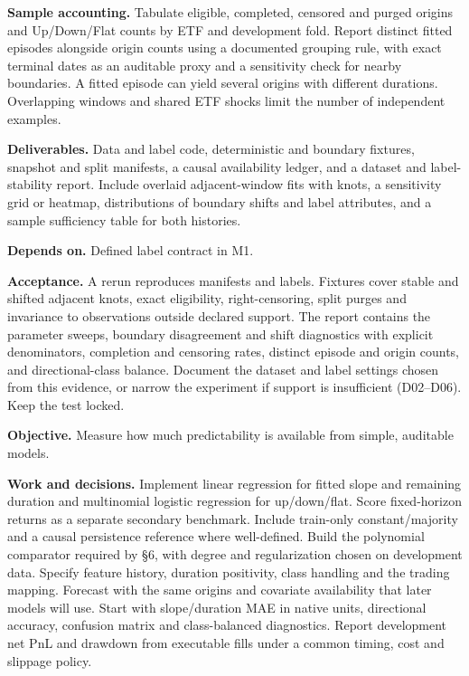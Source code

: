 \documentclass[10pt,letterpaper]{article}
\newcommand{\pagetitle}[2]{\vspace*{9pt}{\small\bfseries #1\par}\vspace{5pt}{\LARGE\bfseries #2\par}\vspace{9pt}}
\newcommand{\topic}[1]{\par\smallskip{\large\bfseries #1\par}}
\begin{document}
\textbf{Sample accounting.} Tabulate eligible, completed, censored and purged origins and Up/Down/Flat counts by ETF and development fold. Report distinct fitted episodes alongside origin counts using a documented grouping rule, with exact terminal dates as an auditable proxy and a sensitivity check for nearby boundaries. A fitted episode can yield several origins with different durations. Overlapping windows and shared ETF shocks limit the number of independent examples.\par

\textbf{Deliverables.} Data and label code, deterministic and boundary fixtures, snapshot and split manifests, a causal availability ledger, and a dataset and label-stability report. Include overlaid adjacent-window fits with knots, a sensitivity grid or heatmap, distributions of boundary shifts and label attributes, and a sample sufficiency table for both histories.\par

\textbf{Depends on.} Defined label contract in M1.\par

\textbf{Acceptance.} A rerun reproduces manifests and labels. Fixtures cover stable and shifted adjacent knots, exact eligibility, right-censoring, split purges and invariance to observations outside declared support. The report contains the parameter sweeps, boundary disagreement and shift diagnostics with explicit denominators, completion and censoring rates, distinct episode and origin counts, and directional-class balance. Document the dataset and label settings chosen from this evidence, or narrow the experiment if support is insufficient (D02--D06). Keep the test locked.\par

\clearpage

\pagetitle{PHASE II / A}{Classical baselines}

\topic{03\quad Establish reproducible classical baselines}

\textbf{Objective.} Measure how much predictability is available from simple, auditable models.\par

\textbf{Work and decisions.} Implement linear regression for fitted slope and remaining duration and multinomial logistic regression for up/down/flat. Score fixed-horizon returns as a separate secondary benchmark. Include train-only constant/majority and a causal persistence reference where well-defined. Build the polynomial comparator required by \S 6, with degree and regularization chosen on development data. Specify feature history, duration positivity, class handling and the trading mapping. Forecast with the same origins and covariate availability that later models will use. Start with slope/duration MAE in native units, directional accuracy, confusion matrix and class-balanced diagnostics. Report development net PnL and drawdown from executable fills under a common timing, cost and slippage policy.\par
\end{document}
